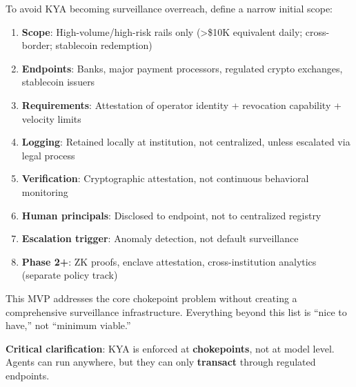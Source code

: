 \documentclass[11pt,letterpaper]{article}
\begin{document}
\begin{keybox}
To avoid KYA becoming surveillance overreach, define a narrow initial scope:

\begin{enumerate}
  \item \textbf{Scope}: High-volume/high-risk rails only (>\$10K equivalent daily; cross-border; stablecoin redemption)
  \item \textbf{Endpoints}: Banks, major payment processors, regulated crypto exchanges, stablecoin issuers
  \item \textbf{Requirements}: Attestation of operator identity + revocation capability + velocity limits
  \item \textbf{Logging}: Retained locally at institution, not centralized, unless escalated via legal process
  \item \textbf{Verification}: Cryptographic attestation, not continuous behavioral monitoring
  \item \textbf{Human principals}: Disclosed to endpoint, not to centralized registry
  \item \textbf{Escalation trigger}: Anomaly detection, not default surveillance
  \item \textbf{Phase 2+}: ZK proofs, enclave attestation, cross-institution analytics (separate policy track)
\end{enumerate}

This MVP addresses the core chokepoint problem without creating a comprehensive surveillance infrastructure. Everything beyond this list is ``nice to have,'' not ``minimum viable.''

\textbf{Critical clarification}: KYA is enforced at \textbf{chokepoints}, not at model level. Agents can run anywhere, but they can only \textbf{transact} through regulated endpoints.
\end{keybox}
\end{document}
